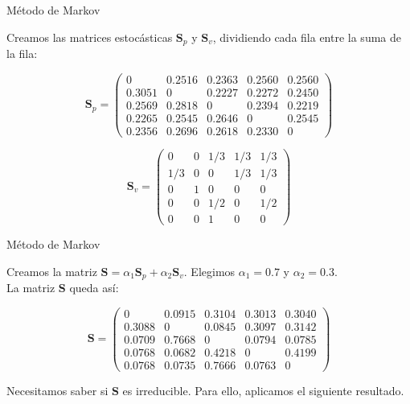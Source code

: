 \documentclass[10pt]{beamer}
\begin{document}
	\begin{frame}{Método de Markov}
		\begin{ejemplo}[continuación]
			Creamos las matrices estocásticas $\mathbf{S}_p$ y $\mathbf{S}_v$, dividiendo cada fila entre la suma de la fila:
			
			\[ \mathbf{S}_p = \left(\begin{array}{rrrrr}
			0      & 0.2516 & 0.2363 & 0.2560 & 0.2560 \\
			0.3051 & 0      & 0.2227 & 0.2272 & 0.2450 \\
			0.2569 & 0.2818 & 0      & 0.2394 & 0.2219 \\
			0.2265 & 0.2545 & 0.2646 & 0      & 0.2545 \\
			0.2356 & 0.2696 & 0.2618 & 0.2330 & 0
			\end{array}\right) \] 
			
			\[ \mathbf{S}_v = \left(\begin{array}{rrrrr}
			0     & 0   & 1/3 & 1/3 & 1/3\\
			1/3   & 0   & 0   & 1/3 & 1/3\\
			0     & 1   & 0   & 0   & 0  \\
			0     & 0   & 1/2 & 0   & 1/2\\
			0     & 0   & 1   & 0   & 0
			\end{array}\right) \]
			
			
		\end{ejemplo}
	\end{frame}
	
	\begin{frame}{Método de Markov}
		\begin{ejemplo}[continuación]
		Creamos la matriz $\mathbf{S} = \alpha_1 \mathbf{S}_p + \alpha_2 \mathbf{S}_v$. Elegimos $\alpha_1 = 0.7$ y $\alpha_2 = 0.3$.\\
		
		La matriz $\mathbf{S}$ queda así:
		
		\[ \mathbf{S} = \left(\begin{array}{rrrrr}
		0      & 0.0915 & 0.3104 & 0.3013 & 0.3040 \\
		0.3088 & 0      & 0.0845 & 0.3097 & 0.3142 \\
		0.0709 & 0.7668 & 0      & 0.0794 & 0.0785 \\
		0.0768 & 0.0682 & 0.4218 & 0      & 0.4199 \\
		0.0768 & 0.0735 & 0.7666 & 0.0763 & 0
		
		\end{array}\right) \]
		
		Necesitamos saber si $\mathbf{S}$ es irreducible. Para ello, aplicamos el siguiente resultado.
		\end{ejemplo}
	\end{frame}
	
\end{document}
